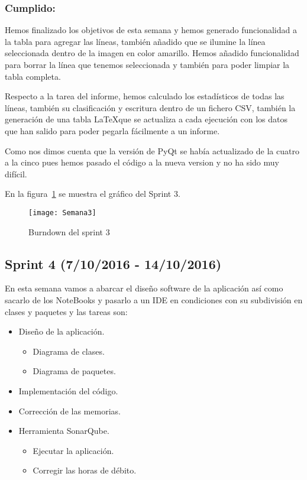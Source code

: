 \subsubsection{Cumplido:}
Hemos finalizado los objetivos de esta semana y hemos generado funcionalidad a la tabla para agregar las líneas, también añadido que se ilumine la línea seleccionada dentro de la imagen en color amarillo. Hemos añadido funcionalidad para borrar la línea que tenemos seleccionada y también para poder limpiar la tabla completa.

Respecto a la tarea del informe, hemos calculado los estadísticos de todas las líneas, también su clasificación y escritura dentro de un fichero CSV, también la generación de una tabla \LaTeX que se actualiza a cada ejecución con los datos que han salido para poder pegarla fácilmente a un informe.

Como nos dimos cuenta que la versión de PyQt se había actualizado de la cuatro a la cinco pues hemos pasado el código a la nueva version y no ha sido muy difícil.

En la figura~\ref{fig:A.2.3} se muestra el gráfico del Sprint 3.

\begin{figure}[h]
\centering
\texttt{[image: Semana3]}
\caption{Burndown del sprint 3}
\label{fig:A.2.3}
\end{figure}


\subsection{Sprint 4 (7/10/2016 - 14/10/2016)}
En esta semana vamos a abarcar el diseño software de la aplicación así como sacarlo de los NoteBooks y pasarlo a un IDE en condiciones con su subdivisión en clases y paquetes y las tareas son:
\begin{itemize}
	\item Diseño de la aplicación.
		\begin{itemize}
			\item Diagrama de clases.
			\item Diagrama de paquetes.
		\end{itemize}
		
	\item Implementación del código.
		
	\item Corrección de las memorias.
	
	\item Herramienta SonarQube.
	\begin{itemize}
		\item Ejecutar la aplicación.
		\item Corregir las horas de débito.
	\end{itemize}
\end{itemize}
